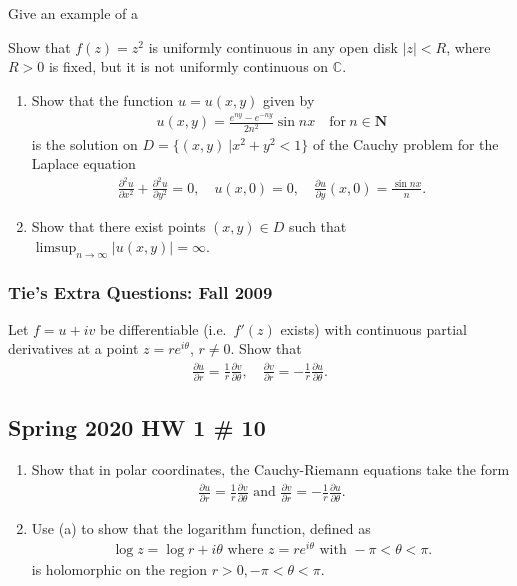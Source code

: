 Give an example of a

Show that \(f(z) = z^2\) is uniformly continuous in any open disk
\(|z| < R\), where \(R>0\) is fixed, but it is not uniformly continuous
on \(\mathbb C\).

\begin{enumerate}
\def\labelenumi{\arabic{enumi}.}
\item
  Show that the function \(u=u(x,y)\) given by
  \begin{align*}
  u(x,y)=\frac{e^{ny}-e^{-ny}}{2n^2}\sin nx\quad \text{for}\ n\in {\mathbf N}
  \end{align*}
  is the solution on \(D=\{(x,y)\ | x^2+y^2<1\}\) of the Cauchy problem
  for the Laplace equation
  \begin{align*}\frac{\partial ^2u}{\partial x^2}+\frac{\partial ^2u}{\partial y^2}=0,\quad
  u(x,0)=0,\quad \frac{\partial u}{\partial y}(x,0)=\frac{\sin nx}{n}.\end{align*}
\item
  Show that there exist points \((x,y)\in D\) such that
  \(\displaystyle{\limsup_{n\to\infty} |u(x,y)|=\infty}\).
\end{enumerate}

\hypertarget{ties-extra-questions-fall-2009}{%
\subsubsection{Tie's Extra Questions: Fall
2009}\label{ties-extra-questions-fall-2009}}

Let \(f=u+iv\) be differentiable (i.e.~\(f'(z)\) exists) with continuous
partial derivatives at a point \(z=re^{i\theta}\), \(r\not= 0\). Show
that
\begin{align*}\frac{\partial u}{\partial r}=\frac{1}{r}\frac{\partial v}{\partial \theta},\quad
\frac{\partial v}{\partial r}=-\frac{1}{r}\frac{\partial u}{\partial \theta}.\end{align*}

\hypertarget{spring-2020-hw-1-10}{%
\subsection{Spring 2020 HW 1 \# 10}\label{spring-2020-hw-1-10}}

\begin{enumerate}
\def\labelenumi{\alph{enumi}.}
\item
  Show that in polar coordinates, the Cauchy-Riemann equations take the
  form
  \begin{align*}
  \frac{\partial u}{\partial r}=\frac{1}{r} \frac{\partial v}{\partial \theta} \text { and } \frac{\partial v}{\partial r}=-\frac{1}{r} \frac{\partial u}{\partial \theta}
  .\end{align*}
\item
  Use (a) to show that the logarithm function, defined as
  \begin{align*}
  \log z=\log r+i \theta \text { where } z=r e^{i \theta} \text { with }-\pi<\theta<\pi
  .\end{align*}
  is holomorphic on the region \(r> 0, -\pi < \theta < \pi\).
\end{enumerate}

